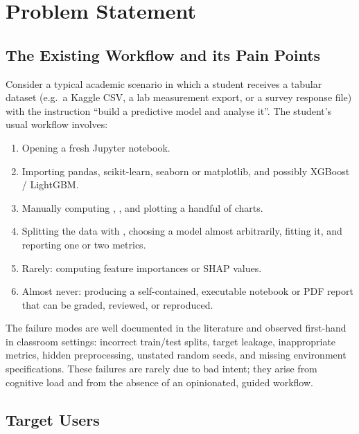 \chapter{Problem Statement}
\label{ch:problem}

\section{The Existing Workflow and its Pain Points}
\label{sec:existing-workflow}

Consider a typical academic scenario in which a student receives a
tabular dataset (e.g.\ a Kaggle CSV, a lab measurement export, or a
survey response file) with the instruction ``build a predictive model
and analyse it''. The student's usual workflow involves:

\begin{enumerate}[leftmargin=1.4em]
  \item Opening a fresh Jupyter notebook.
  \item Importing pandas, scikit-learn, seaborn or matplotlib, and
        possibly XGBoost / LightGBM.
  \item Manually computing , ,
         and plotting a handful of charts.
  \item Splitting the data with , choosing a
        model almost arbitrarily, fitting it, and reporting one or two
        metrics.
  \item Rarely: computing feature importances or SHAP values.
  \item Almost never: producing a self-contained, executable notebook
        or PDF report that can be graded, reviewed, or reproduced.
\end{enumerate}

The failure modes are well documented in the literature
\citep{pineau2021reproducibility, kapoor2022leakage} and observed
first-hand in classroom settings: incorrect train/test splits, target
leakage, inappropriate metrics, hidden preprocessing, unstated random
seeds, and missing environment specifications. These failures are
rarely due to bad intent; they arise from cognitive load and from the
absence of an opinionated, guided workflow.

\section{Target Users}
\label{sec:target-users}

